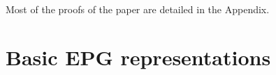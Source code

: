 \documentclass[runningheads]{llncs}
\begin{document}
Most of the proofs of the paper are detailed in the Appendix.
 
\section{Basic EPG representations}




\end{document}
